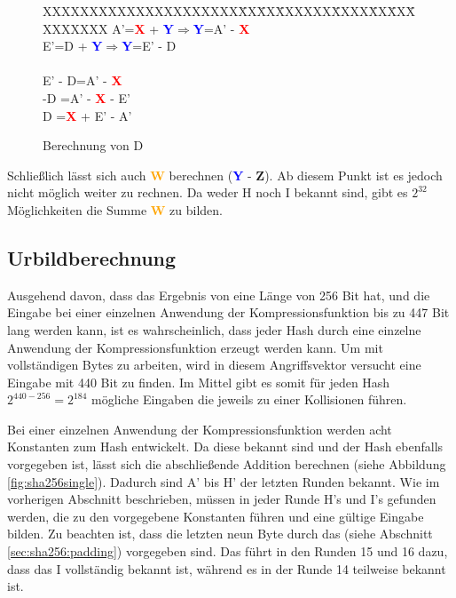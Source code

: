 \begin{figure}[!h]
  \begin{tabbing}
    XXXXXXXXXXXXXXXXXXXXX\=XX\=XX\=XXXXXX\=XXXX\=XX\=XX\=XXXXXXXX \kill
    \>A'\>=\>\textcolor{red}{\textbf{X}} + \textcolor{blue}{\textbf{Y}}\>$\Rightarrow$\>\textcolor{blue}{\textbf{Y}}\>=\>A' - \textcolor{red}{\textbf{X}}\\
    \>E'\>=\>D + \textcolor{blue}{\textbf{Y}}\>$\Rightarrow$\>\textcolor{blue}{\textbf{Y}}\>=\>E' - D\\
    \>~\\
    \>\>\>E' - D\>=\>A' - \textcolor{red}{\textbf{X}}\\
    \>\>\>-D    \>=\>A' - \textcolor{red}{\textbf{X}} - E'\\
    \>\>\>D     \>=\>\textcolor{red}{\textbf{X}} + E' - A'
  \end{tabbing}
  \caption{Berechnung von D}
  \label{eq:calcD}
\end{figure}

Schließlich lässt sich auch \textcolor{orange}{\textbf{W}} berechnen (\textcolor{blue}{\textbf{Y}} - \textcolor{Strong Green}{\textbf{Z}}). Ab diesem Punkt ist
es jedoch nicht möglich weiter zu rechnen. Da weder H noch I bekannt sind, gibt es $2^{32}$ Möglichkeiten die Summe \textcolor{orange}{\textbf{W}} zu bilden.

\subsection{Urbildberechnung}
Ausgehend davon, dass das Ergebnis von  eine Länge von 256 Bit hat, und die Eingabe bei einer einzelnen Anwendung der Kompressionsfunktion bis zu
447 Bit lang werden kann, ist es wahrscheinlich, dass jeder Hash durch eine einzelne Anwendung der Kompressionsfunktion erzeugt werden kann. Um mit vollständigen
Bytes zu arbeiten, wird in diesem Angriffsvektor versucht eine Eingabe mit 440 Bit zu finden. Im Mittel gibt es somit für jeden Hash $2^{440-256} = 2^{184}$
mögliche Eingaben die jeweils zu einer Kollisionen führen.

Bei einer einzelnen Anwendung der Kompressionsfunktion werden acht Konstanten zum Hash entwickelt. Da diese bekannt sind und der Hash ebenfalls vorgegeben ist,
lässt sich die abschließende Addition berechnen (siehe Abbildung \ref{fig:sha256single}). Dadurch sind A' bis H' der letzten Runden bekannt. Wie im vorherigen
Abschnitt beschrieben, müssen in jeder Runde H's und I's gefunden werden, die zu den vorgegebene Konstanten führen und eine gültige Eingabe bilden. Zu beachten
ist, dass die letzten neun Byte durch das  (siehe Abschnitt \ref{sec:sha256:padding}) vorgegeben sind. Das führt in den Runden 15 und 16 dazu, dass
das I vollständig bekannt ist, während es in der Runde 14 teilweise bekannt ist.


